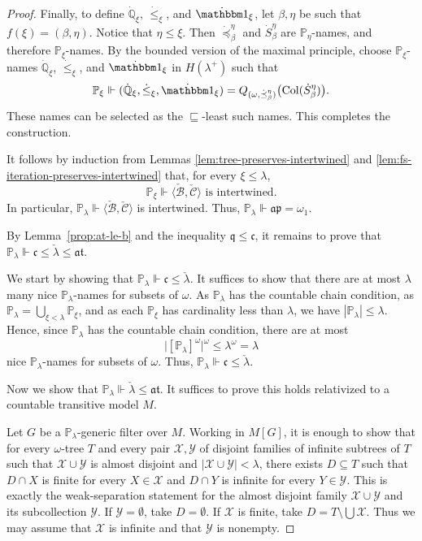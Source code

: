 \begin{proof}
Finally, to define $\dot{\mathbb Q}_\xi$, $\dot{\leq}_\xi$, and $\dot{\mathbbm 1}_\xi$, let $\beta, \eta$ be such that $f(\xi)=(\beta,\eta)$.
Notice that $\eta\leq\xi$.
Then $\dot{\preceq}^\eta_\beta$ and $\dot S^\eta_\beta$ are $\mathbb P_\eta$-names, and therefore $\mathbb P_\xi$-names.
By the bounded version of the maximal principle, choose
$\mathbb P_\xi$-names $\dot{\mathbb Q}_\xi$, $\dot{\leq}_\xi$, and
$\dot{\mathbbm 1}_\xi$ in $H(\lambda^+)$ such that
\[
  \mathbb P_\xi\Vdash
  (\dot{\mathbb Q}_\xi,\dot{\leq}_\xi,\dot{\mathbbm 1}_\xi)
  =
  Q_{(\omega,\dot{\preceq}^\eta_\beta)}
  \bigl(\Col(\dot S^\eta_\beta)\bigr).
\]
These names can be selected as the $\sqsubseteq$-least such names.
This completes the construction.

It follows by induction from Lemmas \ref{lem:tree-preserves-intertwined}
and \ref{lem:fs-iteration-preserves-intertwined} that, for every $\xi\leq\lambda$,
\[
  \mathbb P_\xi\Vdash
  \langle\check{\mathcal B},\check{\mathcal C}\rangle
  \text{ is intertwined}.
\]
In particular, $\mathbb P_\lambda\Vdash \langle\check{\mathcal B},\check{\mathcal C}\rangle$ is intertwined.
Thus, $\mathbb P_\lambda\Vdash \mathfrak{ap}=\omega_1$.

By Lemma~\ref{prop:at-le-b} and the inequality
$\mathfrak q\leq\mathfrak c$, it remains to prove that
$\mathbb P_\lambda\Vdash \mathfrak c\leq\check \lambda\leq\mathfrak{at}$.

We start by showing that $\mathbb P_\lambda\Vdash \mathfrak c\leq \check \lambda$.
It suffices to show that there are at most $\lambda$ many nice $\mathbb P_\lambda$-names for subsets of $\omega$.
As $\mathbb P_\lambda$ has the countable chain condition, as $\mathbb P_\lambda=\bigcup_{\xi<\lambda}\mathbb P_\xi$, and as each $\mathbb P_\xi$ has cardinality less than $\lambda$, we have $|\mathbb P_\lambda|\leq \lambda$.
Hence, since $\mathbb P_\lambda$ has the countable chain condition, there are at most
\[
  \bigl|[\mathbb P_\lambda]^\omega\bigr|^\omega
  \leq\lambda^\omega=\lambda
\]
nice $\mathbb P_\lambda$-names for subsets of $\omega$.
Thus, $\mathbb P_\lambda\Vdash \mathfrak c\leq \check \lambda$.

Now we show that $\mathbb P_\lambda\Vdash \check \lambda\leq \mathfrak{at}$.
It suffices to prove this holds relativized to a countable transitive model $M$.

Let $G$ be a $\mathbb P_\lambda$-generic filter over $M$.
Working in $M[G]$, it is enough to show that for every $\omega$-tree $T$ and every pair $\mathcal X,\mathcal Y$ of disjoint families of infinite subtrees of $T$ such that $\mathcal X\cup\mathcal Y$ is almost disjoint and $|\mathcal X\cup\mathcal Y|<\lambda$, there exists $D\subseteq T$ such that $D\cap X$ is finite for every $X\in\mathcal X$ and $D\cap Y$ is infinite for every $Y\in\mathcal Y$.
This is exactly the weak-separation statement for the almost disjoint family
$\mathcal X\cup\mathcal Y$ and its subcollection $\mathcal Y$.
If $\mathcal Y=\emptyset$, take $D=\emptyset$.
If $\mathcal X$ is finite, take $D=T\setminus\bigcup\mathcal X$.
Thus we may assume that $\mathcal X$ is infinite and that $\mathcal Y$ is nonempty.


\end{proof}
